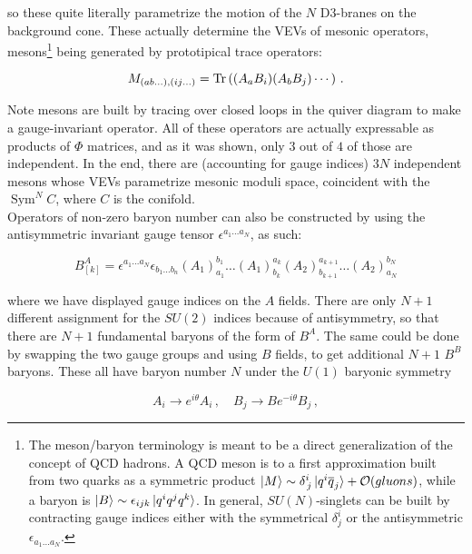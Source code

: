 so these quite literally parametrize the motion of the $N$ D3-branes on the background cone. These actually determine the VEVs of mesonic operators, mesons\footnote{The meson/baryon terminology is meant to be a direct generalization of the concept of QCD hadrons. A QCD meson is to a first approximation built from two quarks as a symmetric product $\ket{M} \sim \delta^i_{\,j} \ket{q^i \overline q_j} + \mathcal O (gluons)$, while a baryon is $\ket{B} \sim \epsilon_{ijk} \ket{q^i q^j q^k}$. In general, $SU(N)$-singlets can be built by contracting gauge indices either with the symmetrical $\delta^i_j$ or the antisymmetric $\epsilon_{a_1 \ldots a_N}$.} being generated by prototipical trace operators:

\begin{equation}
	M_{(ab\ldots),(ij\ldots)} =	\operatorname{Tr}\left( (A_a B_i)(A_b B_j)\cdots \right)\,.
	\label{}
\end{equation}

Note mesons are built by tracing over closed loops in the quiver diagram to make a gauge-invariant operator. All of these operators are actually expressable as products of $\Phi$ matrices, and as it was shown, only $3$ out of $4$ of those are independent. In the end, there are (accounting for gauge indices) $3N$ independent mesons whose VEVs parametrize mesonic moduli space, coincident with the $\operatorname{Sym}^N C$, where $C$ is the conifold.\\

Operators of non-zero baryon number can also be constructed by using the antisymmetric invariant gauge tensor $\epsilon^{a_1\ldots a_N}$, as such:

\begin{equation}
	B^A_{[k]} = \epsilon^{a_1\ldots a_N} \epsilon_{b_1\ldots b_n} (A_1)_{a_1}^{b_1} \ldots (A_1)^{a_k}_{b_k} (A_2)^{a_{k+1}}_{b_{k+1}} \ldots (A_2)^{b_N}_{a_N}
	\label{}
\end{equation}

where we have displayed gauge indices on the $A$ fields. There are only $N+1$ different assignment for the $SU(2)$ indices because of antisymmetry, so that there are $N+1$ fundamental baryons of the form of $B^A$. The same could be done by swapping the two gauge groups and using $B$ fields, to get additional $N+1$ $B^B$ baryons. These all have baryon number $N$ under the $U(1)$ baryonic symmetry

\begin{equation}
	A_i \rightarrow e^{i\theta} A_i\,,\quad B_j \rightarrow B e^{-i\theta}B_j\,,
	\label{}
\end{equation}

